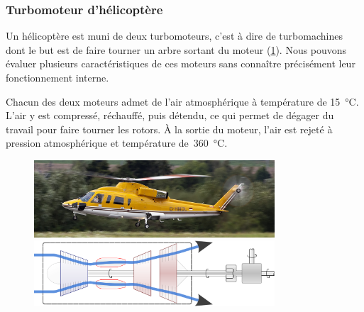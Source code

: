 \subsubsection{Turbomoteur d’hélicoptère}
\label{exo_turbomoteur_puissances_spe}

	Un hélicoptère est muni de deux turbomoteurs, c’est à dire de turbomachines dont le but est de faire tourner un arbre sortant du moteur (\cref{fig_s76b}). Nous pouvons évaluer plusieurs caractéristiques de ces moteurs sans connaître précisément leur fonctionnement interne.
	
	Chacun des deux moteurs admet de l’air atmosphérique à température de \SI{15}{\degreeCelsius}. L’air y est compressé, réchauffé, puis détendu, ce qui permet de dégager du travail pour faire tourner les rotors. À la sortie du moteur, l’air est rejeté à pression atmosphérique et température de~\SI{360}{\degreeCelsius}.

	\begin{figure}
		\begin{center}
			\includegraphics[width=0.8\textwidth]{images/sikorsky_s76b.jpg}
			\vspace{0.5cm}\\
			\includegraphics[width=0.8\textwidth]{images/turbomoteur_principe.png}
		\end{center}
		\label{fig_s76b}
	\end{figure}

